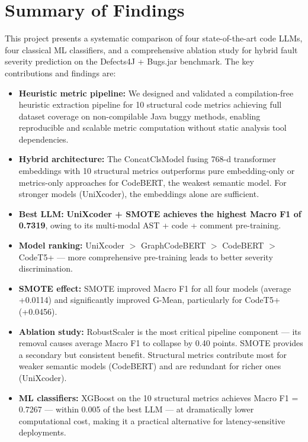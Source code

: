\documentclass[12pt, a4paper]{report}
\begin{document}
\section{Summary of Findings}

This project presents a systematic comparison of four state-of-the-art code LLMs, four classical ML classifiers, and a comprehensive ablation study for hybrid fault severity prediction on the Defects4J + Bugs.jar benchmark. The key contributions and findings are:

\begin{itemize}
  \item \textbf{Heuristic metric pipeline:} We designed and validated a compilation-free heuristic extraction pipeline for 10 structural code metrics achieving full dataset coverage on non-compilable Java buggy methods, enabling reproducible and scalable metric computation without static analysis tool dependencies.

  \item \textbf{Hybrid architecture:} The ConcatClsModel fusing 768-d transformer embeddings with 10 structural metrics outperforms pure embedding-only or metrics-only approaches for CodeBERT, the weakest semantic model. For stronger models (UniXcoder), the embeddings alone are sufficient.

  \item \textbf{Best LLM:} \textbf{UniXcoder + SMOTE achieves the highest Macro F1 of 0.7319}, owing to its multi-modal AST + code + comment pre-training.

  \item \textbf{Model ranking:} UniXcoder $>$ GraphCodeBERT $>$ CodeBERT $>$ CodeT5+ --- more comprehensive pre-training leads to better severity discrimination.

  \item \textbf{SMOTE effect:} SMOTE improved Macro F1 for all four models (average +0.0114) and significantly improved G-Mean, particularly for CodeT5+ (+0.0456).

  \item \textbf{Ablation study:} RobustScaler is the most critical pipeline component --- its removal causes average Macro F1 to collapse by 0.40 points. SMOTE provides a secondary but consistent benefit. Structural metrics contribute most for weaker semantic models (CodeBERT) and are redundant for richer ones (UniXcoder).

  \item \textbf{ML classifiers:} XGBoost on the 10 structural metrics achieves Macro F1 = 0.7267 --- within 0.005 of the best LLM --- at dramatically lower computational cost, making it a practical alternative for latency-sensitive deployments.


\end{itemize}
\end{document}
